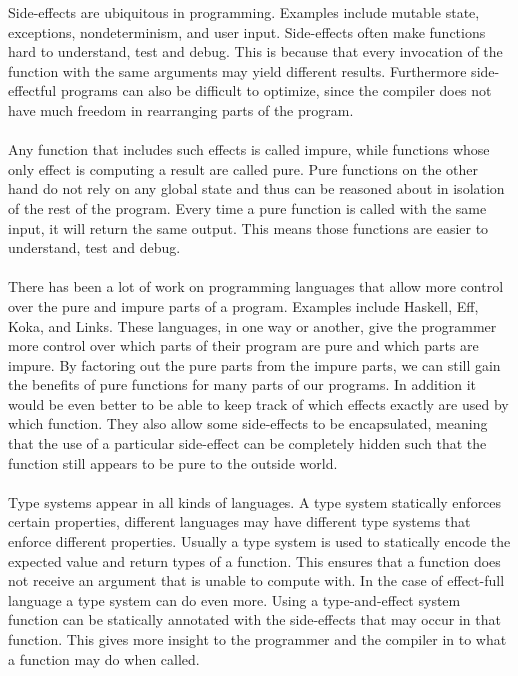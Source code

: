 Side-effects are ubiquitous in programming.
Examples include mutable state, exceptions, nondeterminism, and user input.
Side-effects often make functions hard to understand, test and debug.
This is because that every invocation of the function with the same arguments may yield different results.
Furthermore side-effectful programs can also be difficult to optimize, since the compiler does not have much freedom in rearranging parts of the program.
\\\\
Any function that includes such effects is called impure, while functions whose only effect is computing a result are called pure.
Pure functions on the other hand do not rely on any global state and thus can be reasoned about in isolation of the rest of the program.
Every time a pure function is called with the same input, it will return the same output.
This means those functions are easier to understand, test and debug.
\\\\
There has been a lot of work on programming languages that allow more control over the pure and impure parts of a program.
Examples include Haskell\cite{haskell}, Eff\cite{eff1}, Koka\cite{koka2}, and Links\cite{links}.
These languages, in one way or another, give the programmer more control over which parts of their program are pure and which parts are impure.
By factoring out the pure parts from the impure parts, we can still gain the benefits of pure functions for many parts of our programs.
In addition it would be even better to be able to keep track of which effects exactly are used by which function.
They also allow some side-effects to be encapsulated, meaning that the use of a particular side-effect can be completely hidden such that the function still appears to be pure to the outside world.
\\\\
Type systems appear in all kinds of languages.
A type system statically enforces certain properties, different languages may have different type systems that enforce different properties.
Usually a type system is used to statically encode the expected value and return types of a function.
This ensures that a function does not receive an argument that is unable to compute with.
In the case of effect-full language a type system can do even more.
Using a type-and-effect system function can be statically annotated with the side-effects that may occur in that function.
This gives more insight to the programmer and the compiler in to what a function may do when called.
